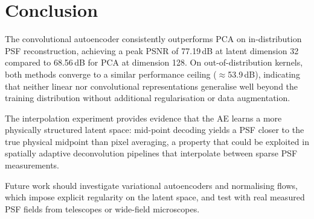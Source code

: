 \documentclass{article}
\begin{document}
\section{Conclusion}
The convolutional autoencoder consistently outperforms PCA on
in-distribution PSF reconstruction, achieving a peak PSNR of
77.19\,dB at latent dimension 32 compared to
68.56\,dB for PCA at dimension 128. On out-of-distribution
kernels, both methods converge to a similar performance ceiling
($\approx$53.9\,dB), indicating that neither linear
nor convolutional representations generalise well beyond the training
distribution without additional regularisation or data augmentation.

The interpolation experiment provides evidence that the AE learns a
more physically structured latent space: mid-point decoding yields a
PSF closer to the true physical midpoint than pixel averaging, a
property that could be exploited in spatially adaptive deconvolution
pipelines that interpolate between sparse PSF measurements.

Future work should investigate variational autoencoders and
normalising flows, which impose explicit regularity on the latent
space, and test with real measured PSF fields from telescopes or
wide-field microscopes.
\end{document}
